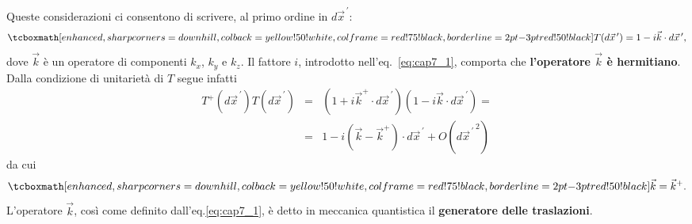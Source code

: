 \documentclass[a4paper,12pt,oneside]{book}
\begin{document}
Queste considerazioni ci consentono di scrivere, al primo ordine in $d{\vec{x}}^{\, \prime}$:
	\begin{equation}
		\label{eq:cap7_1}
		\tcboxmath[enhanced,sharp corners=downhill ,colback=yellow!50!white,colframe=red!75!black, borderline={2pt}{-3pt}{red!50!black}]{
			T(d{\vec{x}}^{\, \prime})=1-i\vec{k}\cdot d{\vec{x}}^{\, \prime} ,
			}
	\end{equation}
dove $\vec{k}$ è un operatore di componenti $k_x$, $k_y$ e $k_z$. Il fattore $i$, introdotto nell'eq.~\eqref{eq:cap7_1}, comporta che \textbf{l'operatore ${\vec{k}}$ è hermitiano}. Dalla condizione di unitarietà di $T$ segue infatti
	\begin{eqnarray}
		T^+(d{\vec{x}}^{\, \prime}) T(d{\vec{x}}^{\, \prime}) & = & \left(1+i\vec{k}^{+}\cdot d{\vec{x}}^{\, \prime}\right) \left(1-i\vec{k}\cdot d{\vec{x}}^{\, \prime}\right) = \nonumber \\ 
		& = & 1-i\left(\vec{k}-\vec{k}^{+}\right)\cdot d{\vec{x}}^{\, \prime}+O({d{\vec{x}}^{\, \prime} }^{\, 2}) 
	\end{eqnarray}
da cui
	\begin{equation}
		\tcboxmath[enhanced,sharp corners=downhill ,colback=yellow!50!white,colframe=red!75!black, borderline={2pt}{-3pt}{red!50!black}]{	
			\vec{k}=\vec{k}^+ .
			}
	\end{equation}
L'operatore $\vec{k}$, così come definito dall'eq.\eqref{eq:cap7_1}, è detto in meccanica quantistica il \textbf{generatore delle traslazioni}.\\
\end{document}
